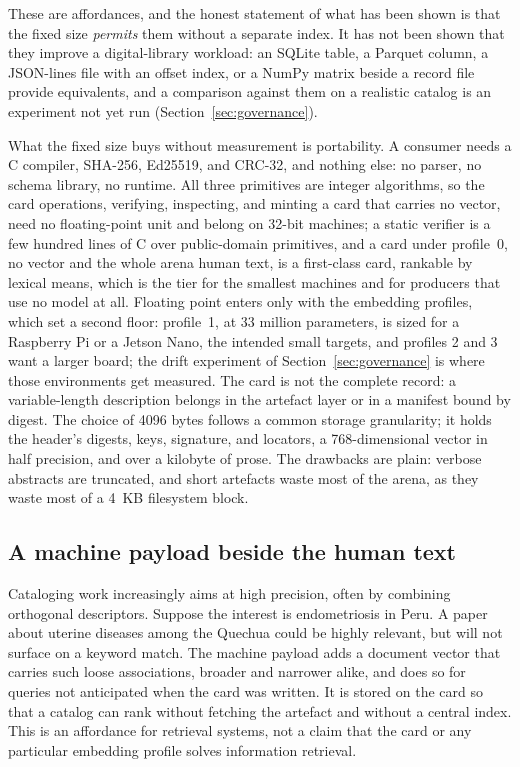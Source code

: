 \documentclass[sigconf]{acmart}
\begin{document}
These are affordances, and the honest statement of what has been shown is
that the fixed size \emph{permits} them without a separate index. It has not
been shown that they improve a digital-library workload: an SQLite table, a
Parquet column, a JSON-lines file with an offset index, or a NumPy matrix
beside a record file provide equivalents, and a comparison against them on a
realistic catalog is an experiment not yet run (Section~\ref{sec:governance}).

What the fixed size buys without measurement is portability. A consumer
needs a C compiler, SHA-256, Ed25519, and CRC-32, and nothing else: no
parser, no schema library, no runtime. All three primitives are integer
algorithms, so the card operations, verifying, inspecting, and minting a
card that carries no vector, need no floating-point unit and belong on
32-bit machines; a static verifier is a few hundred lines of C over
public-domain primitives, and a card under profile~0, no vector and the
whole arena human text, is a first-class card, rankable by lexical means,
which is the tier for the smallest machines and for producers that use no
model at all. Floating point enters only with the embedding profiles, which
set a second floor: profile~1, at 33 million parameters, is sized for a
Raspberry Pi or a Jetson Nano, the intended small targets, and profiles 2
and 3 want a larger board; the drift experiment of
Section~\ref{sec:governance} is where those environments get measured. The
card is not the complete record: a variable-length description belongs in
the artefact layer or in a manifest bound by digest. The choice of 4096
bytes follows a common storage granularity; it holds the header's digests,
keys, signature, and locators, a 768-dimensional vector in half precision,
and over a kilobyte of prose. The drawbacks are plain: verbose abstracts are
truncated, and short artefacts waste most of the arena, as they waste most
of a 4~KB filesystem block.

\subsection{A machine payload beside the human text}

Cataloging work increasingly aims at high precision, often by combining
orthogonal descriptors. Suppose the interest is endometriosis in Peru. A
paper about uterine diseases among the Quechua could be highly relevant, but
will not surface on a keyword match. The machine payload adds a document
vector that carries such loose associations, broader and narrower alike, and
does so for queries not anticipated when the card was written. It is stored
on the card so that a catalog can rank without fetching the artefact and
without a central index. This is an affordance for retrieval systems, not a
claim that the card or any particular embedding profile solves information
retrieval.
\end{document}
